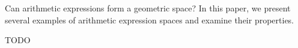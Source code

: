 Can arithmetic expressions form a geometric space?
In this paper, we present several examples of arithmetic expression spaces and examine their properties.

TODO
